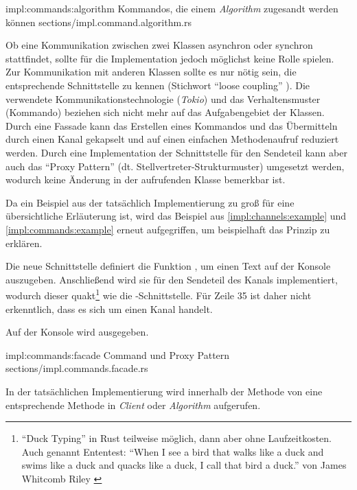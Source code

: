 \rustcinclude
	{impl:commands:algorithm}
	{Kommandos, die einem \textit{Algorithm} zugesandt werden können}
	{sections/impl.command.algorithm.rs}

Ob eine Kommunikation zwischen zwei Klassen asynchron oder synchron stattfindet, sollte für die Implementation jedoch möglichst keine Rolle spielen.
Zur Kommunikation mit anderen Klassen sollte es nur nötig sein, die entsprechende Schnittstelle zu kennen (Stichwort \enquote{loose coupling} \cite[49]{goll2018entwurfsprinzipien}).
Die verwendete Kommunikationstechnologie (\textit{Tokio}) und das Verhaltensmuster (Kommando) beziehen sich nicht mehr auf das Aufgabengebiet der Klassen.
Durch eine Fassade kann das Erstellen eines Kommandos und das Übermitteln durch einen Kanal gekapselt und auf einen einfachen Methodenaufruf reduziert werden.
Durch eine Implementation der Schnittstelle für den Sendeteil kann aber auch das \enquote{Proxy Pattern} (dt. Stellvertreter-Strukturmuster) \cite[137]{goll2018entwurfsprinzipien} umgesetzt werden, wodurch keine Änderung in der aufrufenden Klasse bemerkbar ist.

Da ein Beispiel aus der tatsächlich Implementierung zu groß für eine übersichtliche Erläuterung ist, wird das Beispiel aus \autoref{impl:channels:example} und \autoref{impl:commands:example} erneut aufgegriffen, um beispielhaft das Prinzip zu erklären.

Die neue Schnittstelle  definiert die Funktion , um einen Text auf der Konsole auszugeben.
Anschließend wird sie für den Sendeteil des Kanals implementiert, wodurch dieser quakt\footnote{\enquote{Duck Typing} \cite[44]{rust:orly_programming} in Rust teilweise möglich, dann aber ohne Laufzeitkosten. Auch genannt Ententest: \enquote{When I see a bird that walks like a duck and swims like a duck and quacks like a duck, I call that bird a duck.} von James Whitcomb Riley \cite{wiki:duck}} wie die -Schnittstelle.
Für Zeile 35 ist daher nicht erkenntlich, dass es sich um einen Kanal handelt.

Auf der Konsole wird  ausgegeben.

\rustcinclude
	{impl:commands:facade}
	{Command und Proxy Pattern}
	{sections/impl.commands.facade.rs}

In der tatsächlichen Implementierung wird innerhalb der  Methode von  eine entsprechende Methode in \textit{Client} oder \textit{Algorithm} aufgerufen.

